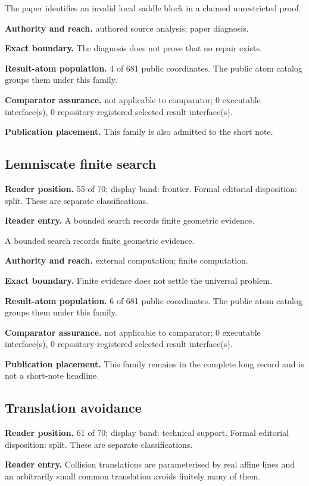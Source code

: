\documentclass[11pt]{article}
\begin{document}
The paper identifies an invalid local saddle block in a claimed unrestricted proof.

\textbf{Authority and reach.} authored source analysis; paper diagnosis.

\textbf{Exact boundary.} The diagnosis does not prove that no repair exists.

\textbf{Result-atom population.} 4 of 681 public coordinates. The public atom catalog groups them under this family.

\textbf{Comparator assurance.} not applicable to comparator; 0 executable interface(s), 0 repository-registered selected result interface(s).

\textbf{Publication placement.} This family is also admitted to the short note.

\subsection{Lemniscate finite search}
\textbf{Reader position.} 55 of 70; display band: frontier.  Formal editorial disposition: split.  These are separate classifications.

\textbf{Reader entry.} A bounded search records finite geometric evidence.

A bounded search records finite geometric evidence.

\textbf{Authority and reach.} external computation; finite computation.

\textbf{Exact boundary.} Finite evidence does not settle the universal problem.

\textbf{Result-atom population.} 6 of 681 public coordinates. The public atom catalog groups them under this family.

\textbf{Comparator assurance.} not applicable to comparator; 0 executable interface(s), 0 repository-registered selected result interface(s).

\textbf{Publication placement.} This family remains in the complete long record and is not a short-note headline.

\subsection{Translation avoidance}
\textbf{Reader position.} 61 of 70; display band: technical support.  Formal editorial disposition: split.  These are separate classifications.

\textbf{Reader entry.} Collision translations are parameterised by real affine lines and an arbitrarily small common translation avoids finitely many of them.
\end{document}
